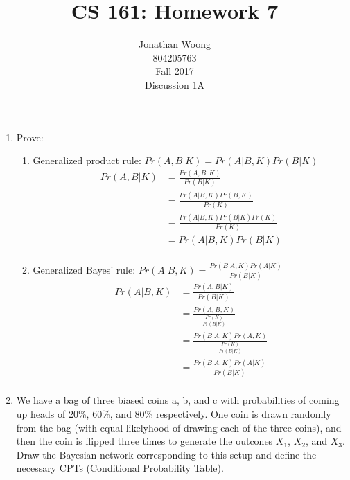 \documentclass[10.5pt,letterpaper]{article}
\date{\displaydate{date}}
\begin{document}
\title{CS 161: Homework 7}
\author{
	Jonathan Woong\\
	804205763\\
	Fall 2017\\
	Discussion 1A}
\maketitle
\pagebreak


\begin{enumerate}[label=\textbf{Problem \arabic*.}]
\item Prove:
	\begin{enumerate}[label=\alph*)]
	\item Generalized product rule: $Pr(A,B|K) = Pr(A|B,K)Pr(B|K)$
	\begin{equation}\nonumber\begin{split}
	Pr(A,B|K) &= \frac{Pr(A,B,K)}{Pr(B|K)} \\
	&= \frac{Pr(A|B,K)Pr(B,K)}{Pr(K)}\\
	&= \frac{Pr(A|B,K)Pr(B|K)Pr(K)}{Pr(K)}\\
	&= Pr(A|B,K)Pr(B|K)\\
	\end{split}\end{equation}
	\item Generalized Bayes' rule: $Pr(A|B,K) = \frac{Pr(B|A,K)Pr(A|K)}{Pr(B|K)}$
	\begin{equation}\nonumber\begin{split}
	Pr(A|B,K) &= \frac{Pr(A,B|K)}{Pr(B|K)}\\
	&= \frac{Pr(A,B,K)}{\frac{Pr(K)}{Pr(B|K)}}\\
	&= \frac{Pr(B|A,K)Pr(A,K)}{\frac{Pr(K)}{Pr(B|K)}}\\
	&= \frac{Pr(B|A,K)Pr(A|K)}{Pr(B|K)}\\
	\end{split}\end{equation}
	\end{enumerate}
\item We have a bag of three biased coins a, b, and c with probabilities of coming up heads of 20\%, 60\%, and 80\% respectively. One coin is drawn randomly from the bag (with equal likelyhood of drawing each of the three coins), and then the coin is flipped three times to generate the outcones $X_1$, $X_2$, and $X_3$.\\
Draw the Bayesian network corresponding to this setup and define the necessary CPTs (Conditional Probability Table).\\

\end{enumerate}
\end{document}
